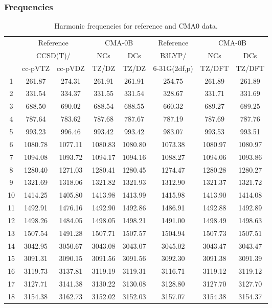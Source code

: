 \documentclass[10pt,oneside]{article}
\begin{document}
\subsubsection*{Frequencies}
\begin{table}[h!]
\centering
\caption{Harmonic frequencies for reference and CMA0 data.}
\begin{tabular}{cccccccc}
\toprule
{} & \multicolumn{2}{c}{Reference} & \multicolumn{2}{c}{CMA-0B} &    Reference & \multicolumn{2}{c}{CMA-0B} \\
{} & \multicolumn{2}{c}{CCSD(T)/} &     NCs &     DCs &       B3LYP/ &     NCs &     DCs \\
{} &   cc-pVTZ & cc-pVDZ &   TZ/DZ &   TZ/DZ & 6-31G(2df,p) &  TZ/DFT &  TZ/DFT \\
\midrule
1  &    261.87 &  274.31 &  261.91 &  261.91 &       254.75 &  261.89 &  261.89 \\
2  &    331.54 &  334.37 &  331.55 &  331.54 &       328.67 &  331.71 &  331.69 \\
3  &    688.50 &  690.02 &  688.54 &  688.55 &       660.32 &  689.27 &  689.25 \\
4  &    787.64 &  783.62 &  787.68 &  787.67 &       787.19 &  787.69 &  787.76 \\
5  &    993.23 &  996.46 &  993.42 &  993.42 &       983.07 &  993.53 &  993.51 \\
6  &   1080.78 & 1077.11 & 1080.83 & 1080.80 &      1073.38 & 1080.97 & 1080.97 \\
7  &   1094.08 & 1093.72 & 1094.17 & 1094.16 &      1088.27 & 1094.06 & 1093.86 \\
8  &   1280.40 & 1271.03 & 1280.41 & 1280.45 &      1274.47 & 1280.28 & 1280.27 \\
9  &   1321.69 & 1318.06 & 1321.82 & 1321.93 &      1312.90 & 1321.37 & 1321.72 \\
10 &   1414.25 & 1405.80 & 1413.98 & 1413.99 &      1415.98 & 1413.90 & 1414.08 \\
11 &   1492.91 & 1476.16 & 1492.90 & 1492.86 &      1486.91 & 1492.88 & 1492.89 \\
12 &   1498.26 & 1484.05 & 1498.05 & 1498.21 &      1491.00 & 1498.49 & 1498.63 \\
13 &   1507.54 & 1491.28 & 1507.71 & 1507.57 &      1504.94 & 1507.73 & 1507.51 \\
14 &   3042.95 & 3050.67 & 3043.08 & 3043.07 &      3045.02 & 3043.47 & 3043.47 \\
15 &   3091.31 & 3090.15 & 3091.56 & 3091.56 &      3092.30 & 3091.38 & 3091.39 \\
16 &   3119.73 & 3137.81 & 3119.19 & 3119.31 &      3116.71 & 3119.12 & 3119.12 \\
17 &   3127.71 & 3141.38 & 3130.22 & 3130.08 &      3128.80 & 3127.70 & 3127.70 \\
18 &   3154.38 & 3162.73 & 3152.02 & 3152.03 &      3157.07 & 3154.38 & 3154.37 \\
\bottomrule
\end{tabular}
\end{table}
\end{document}
